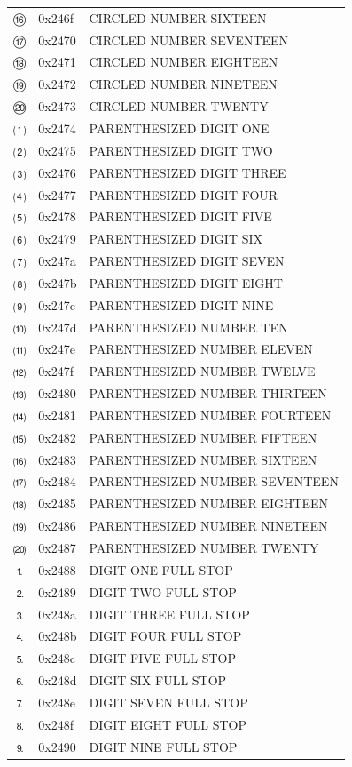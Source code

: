 \documentclass[12pt, twoside]{article}
\begin{document}
\begin{longtable}{L{1.0cm} L{2.0cm} >{\footnotesize}L{10cm}}
$⑯$&0x246f&CIRCLED NUMBER SIXTEEN\\
$⑰$&0x2470&CIRCLED NUMBER SEVENTEEN\\
$⑱$&0x2471&CIRCLED NUMBER EIGHTEEN\\
$⑲$&0x2472&CIRCLED NUMBER NINETEEN\\
$⑳$&0x2473&CIRCLED NUMBER TWENTY\\
$⑴$&0x2474&PARENTHESIZED DIGIT ONE\\
$⑵$&0x2475&PARENTHESIZED DIGIT TWO\\
$⑶$&0x2476&PARENTHESIZED DIGIT THREE\\
$⑷$&0x2477&PARENTHESIZED DIGIT FOUR\\
$⑸$&0x2478&PARENTHESIZED DIGIT FIVE\\
$⑹$&0x2479&PARENTHESIZED DIGIT SIX\\
$⑺$&0x247a&PARENTHESIZED DIGIT SEVEN\\
$⑻$&0x247b&PARENTHESIZED DIGIT EIGHT\\
$⑼$&0x247c&PARENTHESIZED DIGIT NINE\\
$⑽$&0x247d&PARENTHESIZED NUMBER TEN\\
$⑾$&0x247e&PARENTHESIZED NUMBER ELEVEN\\
$⑿$&0x247f&PARENTHESIZED NUMBER TWELVE\\
$⒀$&0x2480&PARENTHESIZED NUMBER THIRTEEN\\
$⒁$&0x2481&PARENTHESIZED NUMBER FOURTEEN\\
$⒂$&0x2482&PARENTHESIZED NUMBER FIFTEEN\\
$⒃$&0x2483&PARENTHESIZED NUMBER SIXTEEN\\
$⒄$&0x2484&PARENTHESIZED NUMBER SEVENTEEN\\
$⒅$&0x2485&PARENTHESIZED NUMBER EIGHTEEN\\
$⒆$&0x2486&PARENTHESIZED NUMBER NINETEEN\\
$⒇$&0x2487&PARENTHESIZED NUMBER TWENTY\\
$⒈$&0x2488&DIGIT ONE FULL STOP\\
$⒉$&0x2489&DIGIT TWO FULL STOP\\
$⒊$&0x248a&DIGIT THREE FULL STOP\\
$⒋$&0x248b&DIGIT FOUR FULL STOP\\
$⒌$&0x248c&DIGIT FIVE FULL STOP\\
$⒍$&0x248d&DIGIT SIX FULL STOP\\
$⒎$&0x248e&DIGIT SEVEN FULL STOP\\
$⒏$&0x248f&DIGIT EIGHT FULL STOP\\
$⒐$&0x2490&DIGIT NINE FULL STOP\\

\end{longtable}
\end{document}
